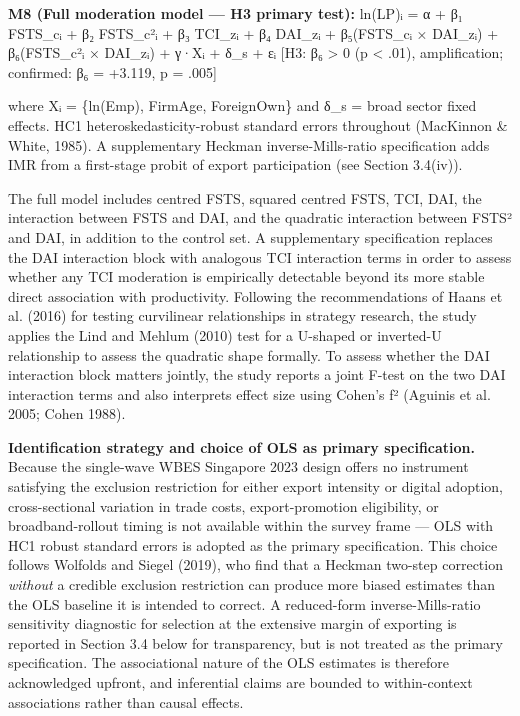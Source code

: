 \documentclass[12pt,a4paper]{article}
\begin{document}
\textbf{M8 (Full moderation model --- H3 primary test):} ln(LP)ᵢ = α +
β₁ FSTS\_cᵢ + β₂ FSTS\_c²ᵢ + β₃ TCI\_zᵢ + β₄ DAI\_zᵢ + β₅(FSTS\_cᵢ ×
DAI\_zᵢ) + β₆(FSTS\_c²ᵢ × DAI\_zᵢ) + γ·Xᵢ + δ\_s + εᵢ {[}H3: β₆
\textgreater{} 0 (p \textless{} .01), amplification; confirmed: β₆ =
+3.119, p = .005{]}

where Xᵢ = \{ln(Emp), FirmAge, ForeignOwn\} and δ\_s = broad sector
fixed effects. HC1 heteroskedasticity-robust standard errors throughout
(MacKinnon \& White, 1985). A supplementary Heckman inverse-Mills-ratio
specification adds IMR from a first-stage probit of export participation
(see Section 3.4(iv)).

The full model includes centred FSTS, squared centred FSTS, TCI, DAI,
the interaction between FSTS and DAI, and the quadratic interaction
between FSTS² and DAI, in addition to the control set. A supplementary
specification replaces the DAI interaction block with analogous TCI
interaction terms in order to assess whether any TCI moderation is
empirically detectable beyond its more stable direct association with
productivity. Following the recommendations of Haans et al. (2016) for
testing curvilinear relationships in strategy research, the study
applies the Lind and Mehlum (2010) test for a U-shaped or inverted-U
relationship to assess the quadratic shape formally. To assess whether
the DAI interaction block matters jointly, the study reports a joint
F-test on the two DAI interaction terms and also interprets effect size
using Cohen's f² (Aguinis et al. 2005; Cohen 1988).

\textbf{Identification strategy and choice of OLS as primary
specification.} Because the single-wave WBES Singapore 2023 design
offers no instrument satisfying the exclusion restriction for either
export intensity or digital adoption, cross-sectional variation in trade
costs, export-promotion eligibility, or broadband-rollout timing is not
available within the survey frame --- OLS with HC1 robust standard
errors is adopted as the primary specification. This choice follows
Wolfolds and Siegel (2019), who find that a Heckman two-step correction
\emph{without} a credible exclusion restriction can produce more biased
estimates than the OLS baseline it is intended to correct. A
reduced-form inverse-Mills-ratio sensitivity diagnostic for selection at
the extensive margin of exporting is reported in Section 3.4 below for
transparency, but is not treated as the primary specification. The
associational nature of the OLS estimates is therefore acknowledged
upfront, and inferential claims are bounded to within-context
associations rather than causal effects.
\end{document}
